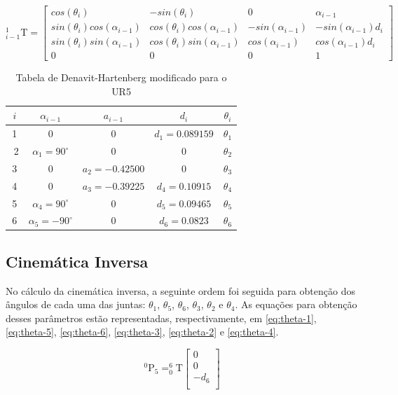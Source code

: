 \begin{equation}\label{eq:dh-modificado}
_{i-1}^{1}\textrm{T}=\begin{bmatrix}
cos(\theta_i) & -sin(\theta_i) & 0 & \alpha _{i-1}\\ 
sin(\theta_i)cos(\alpha _{i-1})& cos(\theta_i)cos(\alpha _{i-1})  & -sin(\alpha _{i-1}) & -sin(\alpha _{i-1})d_i\\ 
sin(\theta_i)sin(\alpha _{i-1})&  cos(\theta_i)sin(\alpha _{i-1}) & cos(\alpha _{i-1}) & cos(\alpha _{i-1})d_i\\ 
0 & 0 & 0 & 1
\end{bmatrix}
\end{equation}

\begin{table}[h!]
	\centering
	\caption{Tabela de Denavit-Hartenberg modificado para o UR5}
	\label{tab:tabela-dh}
	\begin{tabular}{ c| c c c c }
		$i$ & $\alpha_{i-1}$ & $a_{i-1}$ & $d_i$ & $\theta_i$ \\ 
		\hline
		1  & 0 & 0 & $d_1 = 0.089159$ & $\theta_1$ \\  ​
		​2 & $\alpha_1=90^{\circ}$ & 0 & 0 & $\theta_2$  \\
		​3 & 0 & $a_2 = -0.42500$  & 0 & $\theta_3$ \\
		​4 & 0 & $a_3 = -0.39225$ & $d_4 = 0.10915$ & $\theta_4$ \\
		​5 & $\alpha_4=90^{\circ}$ & 0 & $d_5 = 0.09465$ & $\theta_5$ \\
		​6 & $\alpha_5=-90^{\circ}$ & 0 & $d_6 = 0.0823$ & $\theta_6$ 
	\end{tabular}
\end{table}

\subsection{Cinemática Inversa}
\label{ssec:cinematica-inversa}

No cálculo da cinemática inversa, a seguinte ordem foi seguida para obtenção dos ângulos de cada uma das juntas: $\theta_{1}$, $\theta_{5}$, $\theta_{6}$, $\theta_{3}$, $\theta_{2}$ e $\theta_{4}$. As equações para obtenção desses parâmetros estão representadas, respectivamente, em \ref{eq:theta-1}, \ref{eq:theta-5}, \ref{eq:theta-6}, \ref{eq:theta-3}, \ref{eq:theta-2} e \ref{eq:theta-4}.

\begin{equation}\label{eq:translacao-frame-5}
^{0}\textrm{P}_{5} = _{0}^{6}\textrm{T}
	\begin{bmatrix}
		0 \\ 
		0 \\ 
		-d_{6}\\ 
	\end{bmatrix}
\end{equation}


